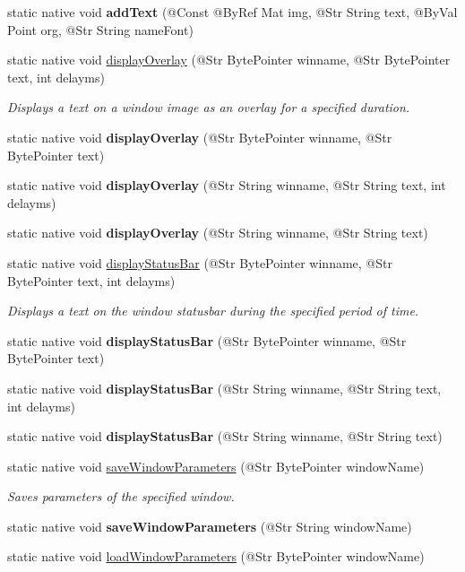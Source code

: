 \begin{DoxyCompactItemize}
\item 
static native void {\bfseries add\+Text} (@Const @By\+Ref Mat img, @Str String text, @By\+Val Point org, @Str String name\+Font)
\item 
static native void \hyperlink{group__highgui__qt_ga70784449604551e57ffd968370f887a8}{display\+Overlay} (@Str Byte\+Pointer winname, @Str Byte\+Pointer text, int delayms)
\begin{DoxyCompactList}\small\item\em Displays a text on a window image as an overlay for a specified duration. \end{DoxyCompactList}\item 
static native void {\bfseries display\+Overlay} (@Str Byte\+Pointer winname, @Str Byte\+Pointer text)
\item 
static native void {\bfseries display\+Overlay} (@Str String winname, @Str String text, int delayms)
\item 
static native void {\bfseries display\+Overlay} (@Str String winname, @Str String text)
\item 
static native void \hyperlink{group__highgui__qt_ga50de3d06722cc9fbc0054f3c83902f1f}{display\+Status\+Bar} (@Str Byte\+Pointer winname, @Str Byte\+Pointer text, int delayms)
\begin{DoxyCompactList}\small\item\em Displays a text on the window statusbar during the specified period of time. \end{DoxyCompactList}\item 
static native void {\bfseries display\+Status\+Bar} (@Str Byte\+Pointer winname, @Str Byte\+Pointer text)
\item 
static native void {\bfseries display\+Status\+Bar} (@Str String winname, @Str String text, int delayms)
\item 
static native void {\bfseries display\+Status\+Bar} (@Str String winname, @Str String text)
\item 
static native void \hyperlink{group__highgui__qt_gac1ea25caaa8647ae67972ac417776344}{save\+Window\+Parameters} (@Str Byte\+Pointer window\+Name)
\begin{DoxyCompactList}\small\item\em Saves parameters of the specified window. \end{DoxyCompactList}\item 
static native void {\bfseries save\+Window\+Parameters} (@Str String window\+Name)
\item 
static native void \hyperlink{group__highgui__qt_gacabd2c2030cc1e76d6537ecf12821fbf}{load\+Window\+Parameters} (@Str Byte\+Pointer window\+Name)

\end{DoxyCompactItemize}
